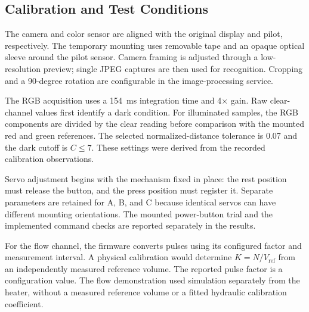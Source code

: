 \subsection{Calibration and Test Conditions}
The camera and color sensor are aligned with the original display and pilot, respectively. The temporary mounting uses removable tape and an opaque optical sleeve around the pilot sensor. Camera framing is adjusted through a low-resolution preview; single JPEG captures are then used for recognition. Cropping and a 90-degree rotation are configurable in the image-processing service.

The RGB acquisition uses a 154~ms integration time and 4$\times$ gain. Raw clear-channel values first identify a dark condition. For illuminated samples, the RGB components are divided by the clear reading before comparison with the mounted red and green references. The selected normalized-distance tolerance is 0.07 and the dark cutoff is $C\leq7$. These settings were derived from the recorded calibration observations.

Servo adjustment begins with the mechanism fixed in place: the rest position must release the button, and the press position must register it. Separate parameters are retained for A, B, and C because identical servos can have different mounting orientations. The mounted power-button trial and the implemented command checks are reported separately in the results.

For the flow channel, the firmware converts pulses using its configured factor and measurement interval. A physical calibration would determine $K=N/V_{\mathrm{ref}}$ from an independently measured reference volume. The reported pulse factor is a configuration value. The flow demonstration used simulation separately from the heater, without a measured reference volume or a fitted hydraulic calibration coefficient.
